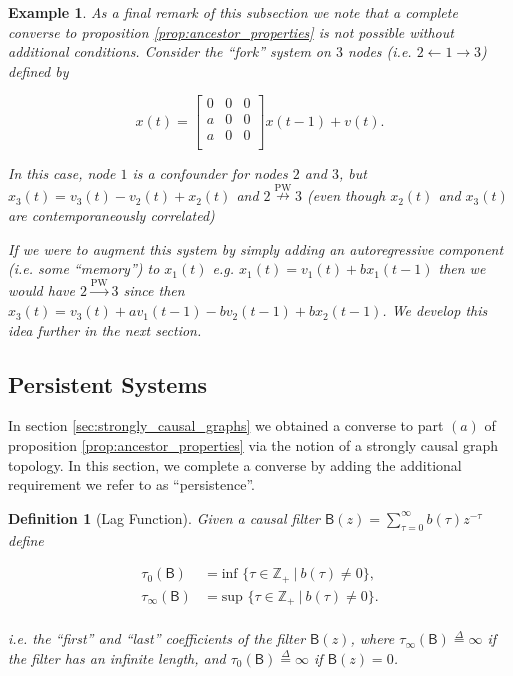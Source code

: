 \documentclass{statsoc}
\def\pwgc{\overset{\text{PW}}{\rightarrow}}  %
\def\npwgc{\overset{\text{PW}}{\nrightarrow}}  %
\def\B{\mathsf{B}}  %
\newtheorem{definition}{Definition}
\newtheorem{example}{Example}
\def\defeq{\overset{\Delta}{=}}  %
\def\Z{\mathbb{Z}}  %
\begin{document}
\begin{example}
  As a final remark of this subsection we note that a complete
  converse to proposition \ref{prop:ancestor_properties} is not
  possible without additional conditions.  Consider the ``fork''
  system on $3$ nodes (i.e. $2 \leftarrow 1 \rightarrow 3$) defined by

  \begin{equation*}
    x(t) =
    \left[
      \begin{array}{cccc}
        0 & 0 & 0\\
        a & 0 & 0\\
        a & 0 & 0\\
      \end{array}
    \right] x(t - 1) + v(t).
  \end{equation*}

  In this case, node $1$ is a confounder for nodes $2$ and $3$, but
  $x_3(t) = v_3(t) - v_2(t) + x_2(t)$ and $2 \npwgc 3$ (even
  though $x_2(t)$ and $x_3(t)$ are contemporaneously correlated)

  If we were to augment this system by simply adding an autoregressive
  component (i.e. some ``memory'') to $x_1(t)$ e.g.
  $x_1(t) = v_1(t) + b x_1(t - 1)$ then we \textit{would} have
  $2 \pwgc 3$ since then
  $x_3(t) = v_3(t) + av_1(t - 1) - bv_2(t - 1) + bx_2(t - 1)$.  We
  develop this idea further in the next section.
\end{example}

\subsection{Persistent Systems}
\label{sec:persistent_systems}
In section \ref{sec:strongly_causal_graphs} we obtained a converse to
part $(a)$ of proposition \ref{prop:ancestor_properties} via the
notion of a strongly causal graph topology.  In this section, we
complete a converse by adding the additional requirement we refer to
as ``persistence''.

\begin{definition}[Lag Function]
  Given a causal filter $\B(z) = \sum_{\tau = 0}^\infty b(\tau)z^{-\tau}$
  define 

  \begin{align}
    \tau_0(\B) &= \text{inf }\{\tau \in \Z_+\ |\ b(\tau) \ne 0\},\\
    \tau_{\infty}(\B) &= \text{sup }\{\tau \in \Z_+\ |\ b(\tau) \ne 0\}.\\
  \end{align}

  i.e. the ``first'' and ``last'' coefficients of the filter $\B(z)$,
  where $\tau_\infty(\B) \defeq \infty$ if the filter has an infinite
  length, and $\tau_0(\B) \defeq \infty$ if $\B(z) = 0$.
\end{definition}
\end{document}
